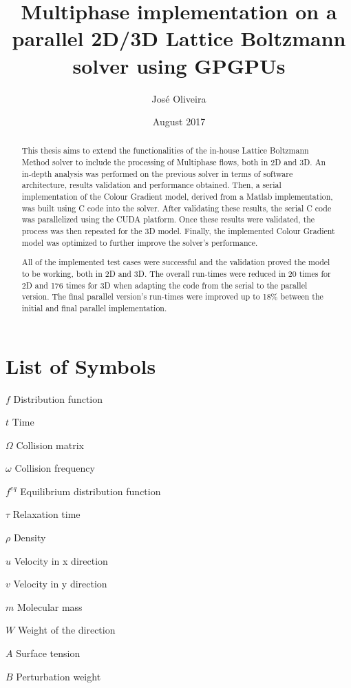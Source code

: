 \documentclass[12pt, openany]{book}
\title{Multiphase implementation on a parallel 2D/3D Lattice Boltzmann solver
	using GPGPUs}
\author{José Oliveira}
\date{August 2017}
\begin{document}
\frontmatter

\maketitle

\begin{abstract}
  This thesis aims to extend the functionalities of the in-house Lattice Boltzmann Method solver to include the processing of Multiphase flows, both in 2D and 3D. An in-depth analysis was performed on the previous solver in terms of software architecture, results validation and performance obtained. Then, a serial implementation of the Colour Gradient model, derived from a Matlab implementation, was built using C code into the solver. After validating these results, the serial C code was parallelized using the CUDA platform. Once these results were validated, the process was then repeated for the 3D model. Finally, the implemented Colour Gradient model was optimized to further improve the solver's performance. \par
  All of the implemented test cases were successful and the validation proved the model to be working, both in 2D and 3D. The overall run-times were reduced in 20 times for 2D and 176 times for 3D when adapting the code from the serial to the parallel version. The final parallel version's run-times were improved up to 18\% between the initial and final parallel implementation.  
\end{abstract}

\sstableofcontents

\sslistoffigures

\sslistoftables

\chapter{List of Symbols}

\begin{abbrv}
	\item[$f$]                   Distribution function
	\item[$t$]                   Time
	\item[$\Omega$]              Collision matrix
	\item[$\omega$]              Collision frequency
	\item[$f^{eq}$]              Equilibrium distribution function
	\item[$\tau$]				 Relaxation time
	\item[$\rho$]				 Density
	\item[$u$]				 Velocity in x direction
	\item[$v$]				 Velocity in y direction
	\item[$m$]				 Molecular mass
	\item[$W$]				 Weight of the direction
	\item[$A$]				 Surface tension
	\item[$B$]				 Perturbation weight
\end{abbrv}
\end{document}
